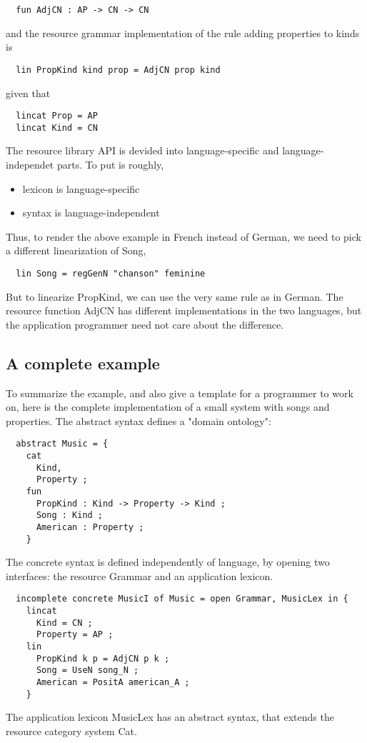 \documentclass[11pt,a4paper]{article}
\begin{document}
\begin{verbatim}
  fun AdjCN : AP -> CN -> CN
\end{verbatim}
and the resource grammar implementation of the rule adding properties
to kinds is

\begin{verbatim}
  lin PropKind kind prop = AdjCN prop kind
\end{verbatim}
given that 

\begin{verbatim}
  lincat Prop = AP
  lincat Kind = CN
\end{verbatim}
The resource library API is devided into language-specific and language-independet
parts. To put is roughly,

\begin{itemize}
\item lexicon is language-specific
\item syntax is language-independent
\end{itemize}

Thus, to render the above example in French instead of German, we need to
pick a different linearization of Song,

\begin{verbatim}
  lin Song = regGenN "chanson" feminine
\end{verbatim}
But to linearize PropKind, we can use the very same rule as in German.
The resource function AdjCN has different implementations in the two
languages, but the application programmer need not care about the difference.

\subsection{A complete example}
To summarize the example, and also give a template for a programmer to work on,
here is the complete implementation of a small system with songs and properties.
The abstract syntax defines a "domain ontology":

\begin{verbatim}
  abstract Music = {
    cat 
      Kind, 
      Property ;
    fun 
      PropKind : Kind -> Property -> Kind ; 
      Song : Kind ;
      American : Property ;
    }
\end{verbatim}
The concrete syntax is defined independently of language, by opening
two interfaces: the resource Grammar and an application lexicon.

\begin{verbatim}
  incomplete concrete MusicI of Music = open Grammar, MusicLex in {
    lincat 
      Kind = CN ;
      Property = AP ;
    lin
      PropKind k p = AdjCN p k ;
      Song = UseN song_N ;
      American = PositA american_A ;
    }
\end{verbatim}
The application lexicon MusicLex has an abstract syntax, that extends
the resource category system Cat.
\end{document}

